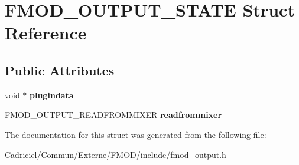 \hypertarget{struct_f_m_o_d___o_u_t_p_u_t___s_t_a_t_e}{}\section{F\+M\+O\+D\+\_\+\+O\+U\+T\+P\+U\+T\+\_\+\+S\+T\+A\+TE Struct Reference}
\label{struct_f_m_o_d___o_u_t_p_u_t___s_t_a_t_e}
\subsection*{Public Attributes}
\begin{DoxyCompactItemize}
\item 
void $\ast$ {\bfseries plugindata}\hypertarget{struct_f_m_o_d___o_u_t_p_u_t___s_t_a_t_e_a08d52689c8b698c0ea363c7403e8978b}{}\label{struct_f_m_o_d___o_u_t_p_u_t___s_t_a_t_e_a08d52689c8b698c0ea363c7403e8978b}

\item 
F\+M\+O\+D\+\_\+\+O\+U\+T\+P\+U\+T\+\_\+\+R\+E\+A\+D\+F\+R\+O\+M\+M\+I\+X\+ER {\bfseries readfrommixer}\hypertarget{struct_f_m_o_d___o_u_t_p_u_t___s_t_a_t_e_a297cdb7fbba2150340cceecf8d4c9ca1}{}\label{struct_f_m_o_d___o_u_t_p_u_t___s_t_a_t_e_a297cdb7fbba2150340cceecf8d4c9ca1}

\end{DoxyCompactItemize}


The documentation for this struct was generated from the following file\+:\begin{DoxyCompactItemize}
\item 
Cadriciel/\+Commun/\+Externe/\+F\+M\+O\+D/include/fmod\+\_\+output.\+h\end{DoxyCompactItemize}
